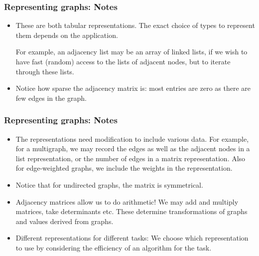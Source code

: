   \begin{frame}[fragile]
\frametitle{Representing graphs: Notes}

\begin{itemize}
\item These are both \color{blue}tabular \color{black} representations. The exact choice of types to represent them depends on the application. 

For example, an adjacency list may be an array of linked lists, if we wish to have fast 
(random) access to the lists of adjacent nodes, but to iterate through these lists.

\item Notice how  \color{blue}sparse \color{black} the adjacency matrix is: most entries are zero as there are few edges in the graph.

\end{itemize}

\end{frame}

   \begin{frame}[fragile]
\frametitle{Representing graphs: Notes}

\begin{itemize}

\item The representations need modification to include various data. For example, for a  \color{blue}multigraph\color{black}, we may record the edges as well as the adjacent nodes in a list representation, or the number of edges in a matrix representation. Also for  \color{blue}edge-weighted graphs, \color{black} we include the weights in the representation.

\item Notice that for undirected graphs, the matrix is  \color{blue}symmetrical\color{black}.
\end{itemize}

\end{frame}

  \begin{frame}[fragile]
\begin{itemize}
\item Adjacency matrices allow us to do  \color{blue}arithmetic\color{black}! We may add and multiply matrices, take determinants etc. These determine transformations of graphs and values derived from graphs.

\item \color{blue}Different representations for different tasks\color{black}: We choose which representation to use
by considering the efficiency of an algorithm for the task. 

\end{itemize}

\end{frame}


